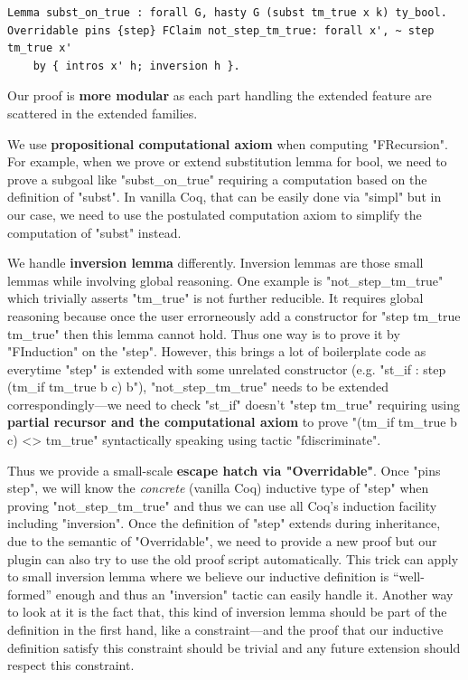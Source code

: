 \begin{verbatim}
Lemma subst_on_true : forall G, hasty G (subst tm_true x k) ty_bool.
Overridable pins {step} FClaim not_step_tm_true: forall x', ~ step tm_true x' 
    by { intros x' h; inversion h }.
\end{verbatim}

Our proof is \textbf{more modular} as each part handling the extended feature are scattered in the extended families.


We use \textbf{propositional computational axiom} when computing "FRecursion". For example, when we prove or extend substitution lemma for bool, we need to prove a subgoal like "subst_on_true" requiring a computation based on the definition of "subst". In vanilla Coq, that can be easily done via "simpl" but in our case, we need to use the postulated computation axiom to simplify the computation of "subst" instead.

We handle \textbf{inversion lemma} differently. Inversion lemmas are those small lemmas while involving global reasoning. One example is "not_step_tm_true" which trivially asserts "tm_true" is not further reducible. It requires global reasoning because once the user errorneously add a constructor for "step tm_true tm_true" then this lemma cannot hold. Thus one way is to prove it by "FInduction" on the "step".  However, this brings a lot of boilerplate code as everytime "step" is extended with some unrelated constructor (e.g. "st_if : step (tm_if tm_true b c) b"), "not_step_tm_true" needs to be extended correspondingly---we need to check "st_if" doesn't "step tm_true" requiring using \textbf{partial recursor and the computational axiom} to prove "(tm_if tm_true b c) <> tm_true" syntactically speaking using tactic "fdiscriminate".

Thus we provide a small-scale \textbf{escape hatch via "Overridable"}. Once "pins {step}", we will know the \textit{concrete} (vanilla Coq) inductive type of "step" when proving "not_step_tm_true" and thus we can use all Coq's induction facility including "inversion". Once the definition of "step" extends during inheritance, due to the semantic of "Overridable", we need to provide a new proof but our plugin can also try to use the old proof script automatically. This trick can apply to small inversion lemma where we believe our inductive definition is ``well-formed'' enough and thus an "inversion" tactic can easily handle it. Another way to look at it is the fact that, this kind of inversion lemma should be part of the definition in the first hand, like a constraint---and the proof that our inductive definition satisfy this constraint should be trivial and any future extension should respect this constraint.

